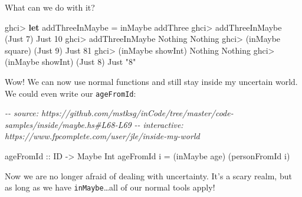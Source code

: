 \documentclass[]{article}
\newenvironment{Shaded}{}{}
\newcommand{\CommentTok}[1]{\textcolor[rgb]{0.38,0.63,0.69}{\textit{#1}}}
\newcommand{\DataTypeTok}[1]{\textcolor[rgb]{0.56,0.13,0.00}{#1}}
\newcommand{\DecValTok}[1]{\textcolor[rgb]{0.25,0.63,0.44}{#1}}
\newcommand{\FunctionTok}[1]{\textcolor[rgb]{0.02,0.16,0.49}{#1}}
\newcommand{\KeywordTok}[1]{\textcolor[rgb]{0.00,0.44,0.13}{\textbf{#1}}}
\newcommand{\NormalTok}[1]{#1}
\newcommand{\OperatorTok}[1]{\textcolor[rgb]{0.40,0.40,0.40}{#1}}
\newcommand{\OtherTok}[1]{\textcolor[rgb]{0.00,0.44,0.13}{#1}}
\newcommand{\StringTok}[1]{\textcolor[rgb]{0.25,0.44,0.63}{#1}}
\begin{document}
What can we do with it?

\begin{Shaded}
\begin{Highlighting}[]
\NormalTok{ghci}\OperatorTok{\textgreater{}} \KeywordTok{let}\NormalTok{ addThreeInMaybe }\OtherTok{=}\NormalTok{ inMaybe addThree}
\NormalTok{ghci}\OperatorTok{\textgreater{}}\NormalTok{ addThreeInMaybe (}\DataTypeTok{Just} \DecValTok{7}\NormalTok{)}
\DataTypeTok{Just} \DecValTok{10}
\NormalTok{ghci}\OperatorTok{\textgreater{}}\NormalTok{ addThreeInMaybe }\DataTypeTok{Nothing}
\DataTypeTok{Nothing}
\NormalTok{ghci}\OperatorTok{\textgreater{}}\NormalTok{ (inMaybe square) (}\DataTypeTok{Just} \DecValTok{9}\NormalTok{)}
\DataTypeTok{Just} \DecValTok{81}
\NormalTok{ghci}\OperatorTok{\textgreater{}}\NormalTok{ (inMaybe }\FunctionTok{showInt}\NormalTok{) }\DataTypeTok{Nothing}
\DataTypeTok{Nothing}
\NormalTok{ghci}\OperatorTok{\textgreater{}}\NormalTok{ (inMaybe }\FunctionTok{showInt}\NormalTok{) (}\DataTypeTok{Just} \DecValTok{8}\NormalTok{)}
\DataTypeTok{Just} \StringTok{"8"}
\end{Highlighting}
\end{Shaded}

Wow! We can now use normal functions and still stay inside my uncertain world.
We could even write our \texttt{ageFromId}:

\begin{Shaded}
\begin{Highlighting}[]
\CommentTok{{-}{-} source: https://github.com/mstksg/inCode/tree/master/code{-}samples/inside/maybe.hs\#L68{-}L69}
\CommentTok{{-}{-} interactive: https://www.fpcomplete.com/user/jle/inside{-}my{-}world}

\OtherTok{ageFromId ::} \DataTypeTok{ID} \OtherTok{{-}\textgreater{}} \DataTypeTok{Maybe} \DataTypeTok{Int}
\NormalTok{ageFromId i }\OtherTok{=}\NormalTok{ (inMaybe age) (personFromId i)}
\end{Highlighting}
\end{Shaded}

Now we are no longer afraid of dealing with uncertainty. It's a scary realm, but
as long as we have \texttt{inMaybe}\ldots all of our normal tools apply!
\end{document}
